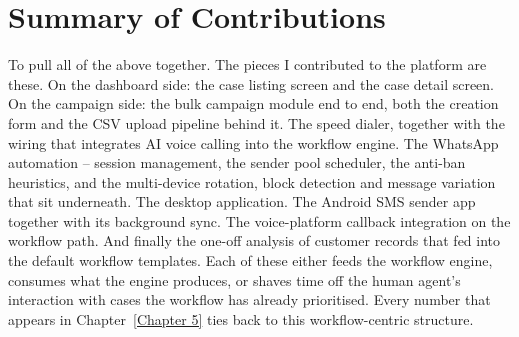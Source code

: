 \section{Summary of Contributions}
To pull all of the above together. The pieces I contributed to the platform are these. On the dashboard side: the case listing screen and the case detail screen. On the campaign side: the bulk campaign module end to end, both the creation form and the CSV upload pipeline behind it. The speed dialer, together with the wiring that integrates AI voice calling into the workflow engine. The WhatsApp automation -- session management, the sender pool scheduler, the anti-ban heuristics, and the multi-device rotation, block detection and message variation that sit underneath. The desktop application. The Android SMS sender app together with its background sync. The voice-platform callback integration on the workflow path. And finally the one-off analysis of customer records that fed into the default workflow templates. Each of these either feeds the workflow engine, consumes what the engine produces, or shaves time off the human agent's interaction with cases the workflow has already prioritised. Every number that appears in Chapter~\ref{Chapter 5} ties back to this workflow-centric structure.
